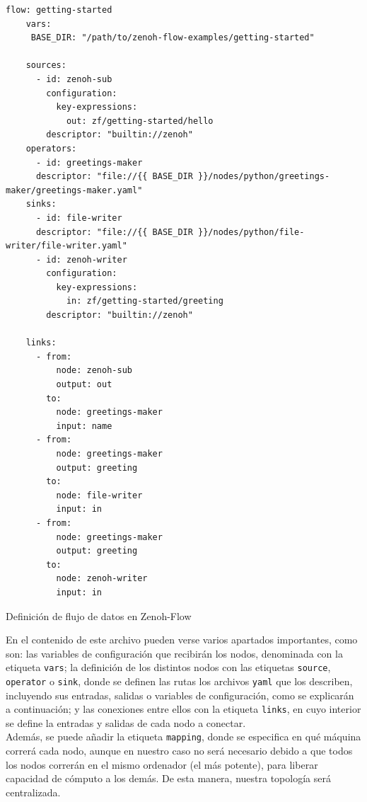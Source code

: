 \begin{code}[h!]
  \begin{lstlisting}[style=yaml]
    flow: getting-started
    vars:
     BASE_DIR: "/path/to/zenoh-flow-examples/getting-started"
    
    sources:
      - id: zenoh-sub
        configuration:
          key-expressions:
            out: zf/getting-started/hello
        descriptor: "builtin://zenoh"
    operators:
      - id: greetings-maker
      descriptor: "file://{{ BASE_DIR }}/nodes/python/greetings-maker/greetings-maker.yaml"
    sinks:
      - id: file-writer
      descriptor: "file://{{ BASE_DIR }}/nodes/python/file-writer/file-writer.yaml"
      - id: zenoh-writer
        configuration:
          key-expressions:
            in: zf/getting-started/greeting
        descriptor: "builtin://zenoh"
    
    links:
      - from:
          node: zenoh-sub
          output: out
        to:
          node: greetings-maker
          input: name
      - from:
          node: greetings-maker
          output: greeting
        to:
          node: file-writer
          input: in
      - from:
          node: greetings-maker
          output: greeting
        to:
          node: zenoh-writer
          input: in
  \end{lstlisting}
\caption[Definición de flujo de datos en Zenoh-Flow]{Definición de flujo de datos en Zenoh-Flow}
\label{cod:data_flow_example}
\end{code}

En el contenido de este archivo pueden verse varios apartados importantes, como
son: las variables de configuración que recibirán los nodos, denominada con la
etiqueta \verb|vars|; la definición de los distintos nodos con las etiquetas
\verb|source|, \verb|operator| o \verb|sink|, donde se definen las rutas los
archivos \texttt{yaml} que los describen, incluyendo sus entradas, salidas o
variables de configuración, como se explicarán a continuación; y las conexiones
entre ellos con la etiqueta \verb|links|, en cuyo interior se define la entradas
y salidas de cada nodo a conectar.
\\

Además, se puede añadir la etiqueta \verb|mapping|, donde se especifica en qué
máquina correrá cada nodo, aunque en nuestro caso no será necesario debido a que
todos los nodos correrán en el mismo ordenador (el más potente), para liberar
capacidad de cómputo a los demás.
De esta manera, nuestra topología será centralizada.
\\

